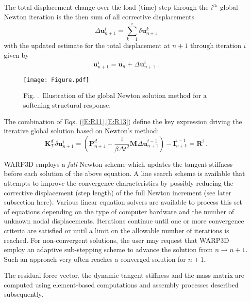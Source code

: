 \documentclass[11pt]{report}
\numberwithin{equation}{section}
\newcommand{\ti}{\emph}
\renewcommand{\thefigure}{\thesection.\arabic{figure}}
\begin{document}
The total displacement change over the load (time) step through the $i^{th}$ global
Newton iteration is the then sum of all corrective displacements
%
\begin{equation}\label{E:du1}
\Delta \bm{u}_{n+1}^i = \sum_{k=1}^i \delta \bm{u}_{n+1}^k
\end{equation}
%
with the updated estimate for the total displacement at $n+1$ through iteration $i$
given by
%
\begin{equation}\label{E:du2}
 \bm{u}_{n+1}^i = \bm{u}_n + \Delta \bm{u}_{n+1}^i\ .
\end{equation}

%
\begin{figure}[tb]
\begin{center}
\texttt{[image: Figure.pdf]} 
\caption{{\small Fig. \thefigure\ Illustration of the global Newton solution 
method for a softening structural response.}
\label{fig:Newton}}
%
\end{center}
\end{figure}
%

The combination of Eqs. (\ref{E:R11},\ref{E:R13}) define the key expression driving the
iterative global solution based on Newton's method:
%
\begin{equation}\label{E:R15}
\mathbf{K}_T^d \, \delta\bm{u}_{n+1}^i= \left ( \bm{P}_{n+1}^d  - \frac{1}{\beta \Delta t^2} 
 \mathbf{M} {\Delta\bm{u}}_{n+1}^{i-1}\right ) - \bm{I}_{n+1}^{i-1}= \bm{R}^i\ .
\end{equation}
%

WARP3D employs a \ti{full} Newton scheme which updates the tangent stiffness
before each solution of the above equation.  A line search scheme is available that
attempts to improve the convergence characteristics by possibly reducing
the corrective displacement (step length) of the full Newton increment
(see later subsection here).
Various linear equation
solvers are available to process this set of equations depending on the type of
computer hardware and the number of unknown nodal displacements. Iterations
continue until one or more convergence criteria are satisfied or until a limit on the
allowable number of iterations is reached. For non-convergent solutions, the user
may request that WARP3D employ an adaptive sub-stepping scheme to advance the
solution from $n\rightarrow n+1$. Such an approach very often reaches a
converged solution for $n+1$.

The residual force vector, the dynamic tangent stiffness and the mass matrix
are computed using element-based computations and assembly processes
described subsequently.
\end{document}

